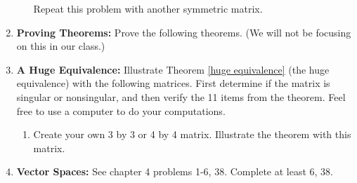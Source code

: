 \begin{enumerate}
\begin{enumerate}
	Repeat this problem with another symmetric matrix. 
\end{enumerate}













\item \textbf{Proving Theorems:} Prove the following theorems. (We will not be focusing on this in our class.)












\item \textbf{A Huge Equivalence:}  
Illustrate Theorem \ref{huge equivalence} \label{equivalence problems} (the huge equivalence) with the following matrices.  First determine if the matrix is singular or nonsingular, and then verify the 11 items from the theorem. Feel free to use a computer to do your computations.
\begin{enumerate}
	\item Create your own 3 by 3 or 4 by 4 matrix. Illustrate the theorem with this matrix.
\end{enumerate}




\item \textbf{Vector Spaces:}  \label{vector space problems}
See chapter 4 problems 1-6, 38. Complete at least 6, 38. 



\end{enumerate}
